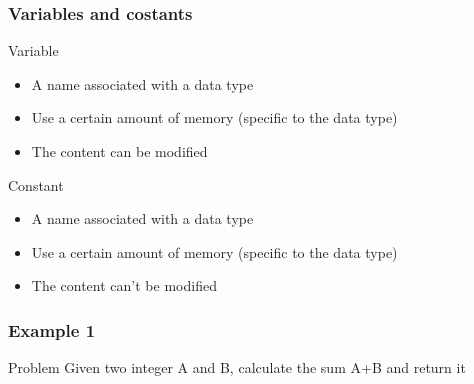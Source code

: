 \begin{frame}
  \frametitle{Variables and costants}
  \begin{center}
  \end{center}
  \begin{block}{Variable}
    \begin{itemize}
    \item A name associated with a data type
    \item Use a certain amount of memory (specific to the data type)
    \item The content \alert{can} be modified
    \end{itemize}
  \end{block}
  \pause
  \begin{block}{Constant}
    \begin{itemize}
    \item A name associated with a data type
    \item Use a certain amount of memory (specific to the data type)
    \item The content \alert{can't} be modified
    \end{itemize}
  \end{block}
\end{frame}

\begin{frame}
  \frametitle{Example 1}
  \begin{block}{Problem}
    Given two integer \alert{A} and \alert{B}, calculate the sum
    \alert{A+B} and return it
  \end{block}
  \pause
  \begin{center}
  \end{center}
\end{frame}

